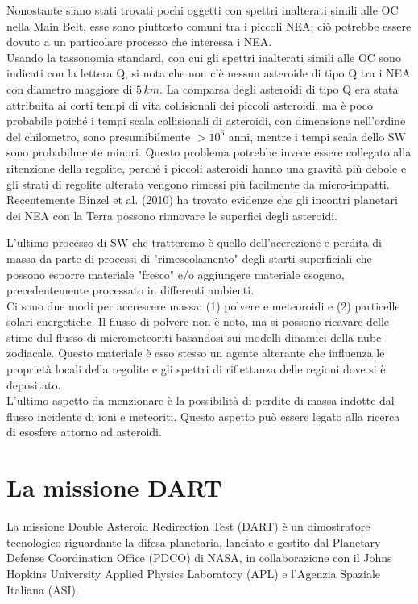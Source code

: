 \documentclass[a4paper,11pt,openright]{book}
\begin{document}
Nonostante siano stati trovati pochi oggetti con spettri inalterati simili alle OC nella Main Belt, esse sono piuttosto comuni tra i piccoli NEA; ciò potrebbe essere dovuto a un particolare processo che interessa i NEA.\\
Usando la tassonomia standard, con cui gli spettri inalterati simili alle OC sono indicati con la lettera Q, si nota che non c'è nessun asteroide di tipo Q tra i NEA con diametro maggiore di $5\,km$. La comparsa degli asteroidi di tipo Q era stata attribuita ai corti tempi di vita collisionali dei piccoli asteroidi, ma è poco probabile poiché i tempi scala collisionali di asteroidi, con dimensione nell'ordine del chilometro, sono presumibilmente $>10^6$ anni, mentre i tempi scala dello SW sono probabilmente minori. Questo problema potrebbe invece essere collegato alla ritenzione della regolite, perché i piccoli asteroidi hanno una gravità più debole e gli strati di regolite alterata vengono rimossi più facilmente da micro-impatti.\\
Recentemente Binzel et al. (2010) ha trovato evidenze che gli incontri planetari dei NEA con la Terra possono rinnovare le superfici degli asteroidi.

L'ultimo processo di SW che tratteremo è quello dell'accrezione e perdita di massa da parte di processi di "rimescolamento" degli starti superficiali che possono esporre materiale "fresco" e/o aggiungere materiale esogeno, precedentemente processato in differenti ambienti.\\
Ci sono due modi per accrescere massa: (1) polvere e meteoroidi e (2) particelle solari energetiche. Il flusso di polvere non è noto, ma si possono ricavare delle stime dul flusso di micrometeoriti basandosi sui modelli dinamici della nube zodiacale. Questo materiale è esso stesso un agente alterante che influenza le proprietà locali della regolite e gli spettri di riflettanza delle regioni dove si è depositato.\\
L'ultimo aspetto da menzionare è la possibilità di perdite di massa indotte dal flusso incidente di ioni e meteoriti. Questo aspetto può essere legato alla ricerca di esosfere attorno ad asteroidi.

\chapter{La missione DART}\label{ch:ch_3}

La missione Double Asteroid Redirection Test (DART) è un dimostratore tecnologico riguardante la difesa planetaria, lanciato e gestito dal Planetary Defense Coordination Office (PDCO) di NASA, in collaborazione con il Johns Hopkins University Applied Physics Laboratory (APL) e l'Agenzia Spaziale Italiana (ASI).
\end{document}
